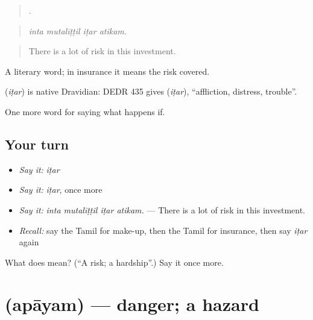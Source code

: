 \begin{quote}
   .
\end{quote}

\begin{quote}
\emph{inta mutalīṭṭil iṭar atikam.}
\end{quote}

\begin{quote}
There is a lot of risk in this investment.
\end{quote}

A literary word; in insurance it means the risk covered.

\begin{cousinweb}
\textbf{} (\emph{iṭar}) is native Dravidian: DEDR 435 gives  (\emph{iṭar}), \textquotedblleft{}affliction, distress, trouble\textquotedblright{}.
\end{cousinweb}

\begin{grammarlens}[title={What you've built}]
One more word for saying what happens if.
\end{grammarlens}

\subsection*{Your turn}
\begin{itemize}
\raggedright
  \item \emph{Say it:} \emph{iṭar}
  \item \emph{Say it:} \emph{iṭar}, once more
  \item \emph{Say it:} \emph{inta mutalīṭṭil iṭar atikam.} — There is a lot of risk in this investment.
  \item \emph{Recall:} say the Tamil for make-up, then the Tamil for insurance, then say \emph{iṭar} again
\end{itemize}

\begin{tcolorbox}[breakable,colback=teal!4,colframe=teal!35!black,title={Before you move on}]
What does  mean? (\textquotedblleft{}A risk; a hardship\textquotedblright{}.) Say it once more.
\end{tcolorbox}
\section[\texorpdfstring{\ta{அபாயம்} (apāyam)}{அபாயம் (apāyam)}]{ (apāyam) — danger; a hazard}

